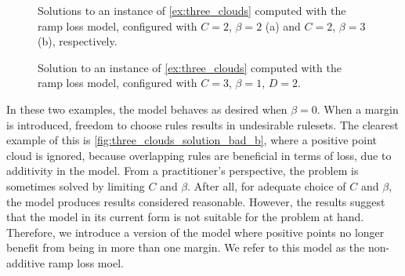 \begin{example}
    \begin{figure}
        \centering
        \begin{subfigure}{.48\textwidth}
            \centering
            
            \caption{}
            \label{fig:three_clouds_solution_bad_a}
        \end{subfigure}
        \hfill
        \begin{subfigure}{.48\textwidth}
            \centering
            
            \caption{}
            \label{fig:three_clouds_solution_bad_b}
        \end{subfigure}
        \caption{Solutions to an instance of \autoref{ex:three_clouds} computed with the ramp loss model, configured with $C=2$, $\beta=2$ (a) and $C=2$, $\beta=3$ (b), respectively.}
        \label{fig:three_clouds_solution_bad}
    \end{figure}

    \begin{figure}
        
        \caption{Solution to an instance of \autoref{ex:three_clouds} computed with the ramp loss model, configured with $C=3$, $\beta=1$, $D=2$.}
        \label{fig:three_clouds_solution_bad_2}
    \end{figure}

\end{example}

In these two examples, the model behaves as desired when $\beta = 0$.
When a margin is introduced, freedom to choose rules results in undesirable rulesets.
The clearest example of this is \autoref{fig:three_clouds_solution_bad_b}, where a positive point cloud is ignored,
because overlapping rules are beneficial in terms of loss, due to additivity in the model.
From a practitioner's perspective, the problem is sometimes solved by limiting $C$ and $\beta$.
After all, for adequate choice of $C$ and $\beta$, the model produces results considered reasonable.
However, the results suggest that the model in its current form is not suitable for the problem at hand.
Therefore, we introduce a version of the model where positive points no longer benefit from being in more than one margin.
We refer to this model as the non-additive ramp loss moel.